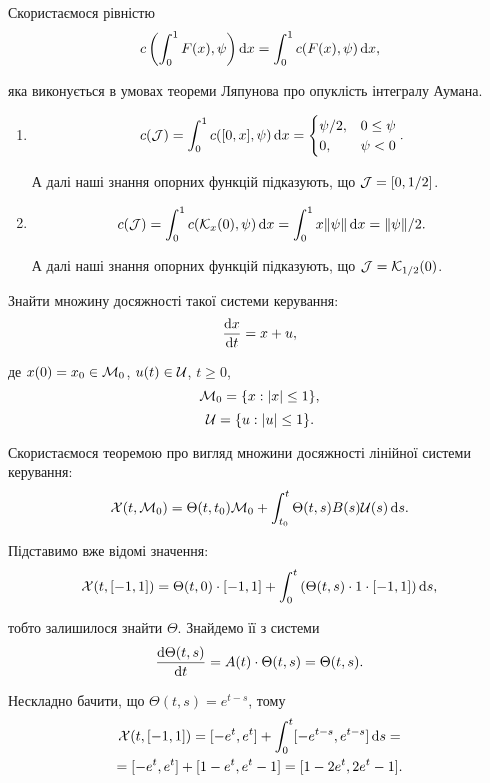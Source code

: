 \begin{solution}
	Скористаємося рівністю \[ c \left(\int_0^1 F(x), \psi\right) \mathop{}\!\mathrm{d} x = \int_0^1 c(F(x), \psi) \mathop{}\!\mathrm{d} x, \]

	яка виконується в умовах теореми Ляпунова про опуклість інтегралу Аумана.

	\begin{enumerate}
		\item \[c(\mathcal{J}) = \int_0^1 c([0, x], \psi) \mathop{}\!\mathrm{d} x = \begin{cases} \psi / 2, & 0 \le \psi \\ 0, & \psi < 0 \end{cases}. \]

		А далі наші знання опорних функцій підказують, що $\mathcal{J} = [0, 1 / 2]$.

		\item \[c(\mathcal{J}) = \int_0^1 c(\mathcal{K}_x(0), \psi) \mathop{}\!\mathrm{d} x = \int_0^1 x \| \psi \| \mathop{}\!\mathrm{d} x = \| \psi \| / 2. \]

		А далі наші знання опорних функцій підказують, що $\mathcal{J} = \mathcal{K}_{1 / 2} (0)$.
	\end{enumerate}
\end{solution}

\begin{problem}
	Знайти множину досяжності такої системи керування: \[ \frac{\mathop{}\!\mathrm{d} x}{\mathop{}\!\mathrm{d} t} = x + u, \]

	де $x (0) = x_0 \in \mathcal{M}_0$, $u (t) \in \mathcal{U}$, $t \ge 0$, \[ \mathcal{M}_0 = \{ x: |x| \le 1 \}, \] \[ \mathcal{U} = \{ u: |u| \le 1 \}. \]
\end{problem}

\begin{solution}
	Скористаємося теоремою про вигляд множини досяжності лінійної системи керування: \[ \mathcal{X}(t, \mathcal{M}_0) = \Theta(t, t_0) \mathcal{M}_0 + \int_{t_0}^t \Theta(t, s) B(s) \mathcal{U}(s) \mathop{}\!\mathrm{d} s. \]

	Підставимо вже відомі значення: \[ \mathcal{X}(t, [-1, 1]) = \Theta(t, 0) \cdot [-1, 1] + \int_0^t \left( \Theta(t, s) \cdot 1 \cdot [-1, 1] \right) \mathop{}\!\mathrm{d} s, \] 

	тобто залишилося знайти $\Theta$. Знайдемо її з системи \[ \frac{\mathop{}\!\mathrm{d} \Theta(t, s)}{\mathop{}\!\mathrm{d} t} = A(t) \cdot \Theta(t, s) = \Theta(t, s). \]

	Нескладно бачити, що $\Theta(t, s) = e^{t - s}$, тому \begin{multline*} \mathcal{X}(t, [-1, 1]) = [-e^t, e^t] + \int_0^t [-e^{t - s}, e^{t - s}] \mathop{}\!\mathrm{d} s = \\ = [-e^t, e^t] + [1 - e^t, e^t - 1] = [1 - 2 e^t, 2 e^t - 1]. \end{multline*} 
\end{solution}

